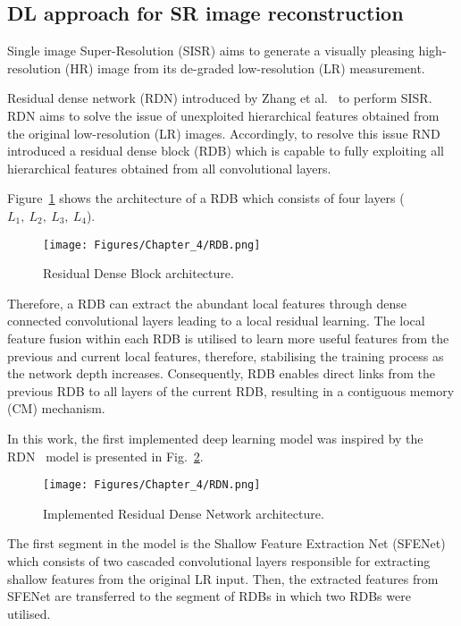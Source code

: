 \subsection{DL approach for SR image reconstruction}
\label{sec63}
Single image Super-Resolution (SISR) aims to generate a visually pleasing high-resolution (HR) image from its de-graded low-resolution (LR) measurement.

Residual dense network (RDN) introduced by Zhang et al.~\cite{Zhang2018} to perform SISR.
RDN aims to solve the issue of unexploited hierarchical features obtained from the original low-resolution (LR) images.
Accordingly, to resolve this issue RND introduced a residual dense block (RDB) which is capable to fully exploiting all hierarchical features obtained from all convolutional layers.

Figure~\ref{fig:RDB} shows the architecture of a RDB which consists of four  layers (\(L_1,\ L_2,\ L_3,\ L_4\)).
\begin{figure} [h!]
	\begin{center}
		\texttt{[image: Figures/Chapter\_4/RDB.png]}
	\end{center}
	\caption{Residual Dense Block architecture.} 
	\label{fig:RDB}
\end{figure}
Therefore, a RDB can extract the abundant local features through dense connected convolutional layers leading to a local residual learning.
The local feature fusion within each RDB is utilised to learn more useful features from the previous and current local features, therefore, stabilising the training process as the network depth increases.
Consequently, RDB enables direct links from the previous RDB to all layers of the current RDB, resulting in a contiguous memory (CM) mechanism.

In this work, the first implemented deep learning model was inspired by the RDN~\cite{Zhang2018} model is presented in Fig.~\ref{fig:RDN}.
\begin{figure} [h!]
	\begin{center}
		\texttt{[image: Figures/Chapter\_4/RDN.png]}
	\end{center}
	\caption{Implemented Residual Dense Network architecture.} 
	\label{fig:RDN}
\end{figure}
The first segment in the model is the Shallow Feature Extraction Net (SFENet) which consists of two cascaded convolutional layers responsible for extracting shallow features from the original LR input.
Then, the extracted features from SFENet are transferred to the segment of RDBs in which two RDBs were utilised.

